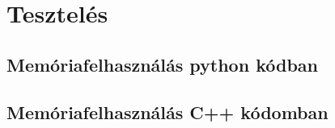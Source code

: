 \documentclass[11pt,a4paper,oneside]{report}
\begin{document}
\selectthesislanguage

\tableofcontents\vfill







\chapter{Tesztelés}
\section{Memóriafelhasználás python kódban}
\section{Memóriafelhasználás C++ kódomban}

% 
% 
% 



\nocite{*}



\end{document}
